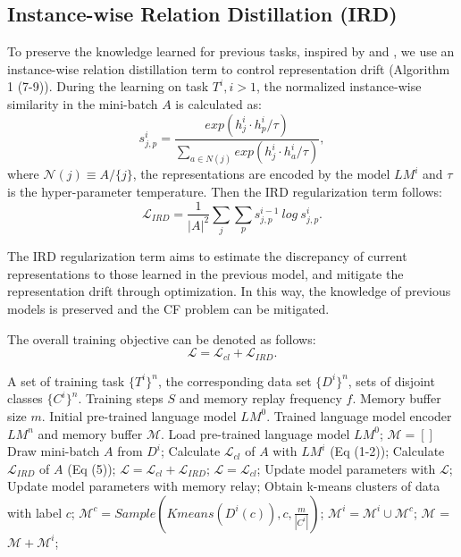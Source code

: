 \subsection{Instance-wise Relation Distillation (IRD)}
To preserve the knowledge learned for previous tasks, inspired by \citet{fang2020seed} and \citet{cha2021co2l}, we use an instance-wise relation distillation term to control representation drift (Algorithm 1 (7-9)). During the learning on task $T^i, i>1$, the normalized instance-wise similarity in the mini-batch $A$ is calculated as:
\begin{equation}
    s_{j,p}^i  =\frac{exp({h}^i_j\cdot{h}^i_p/\tau)}{\sum_{a\in N(j)}exp({h}^i_j\cdot{h}^i_a/\tau)},
\end{equation}
where $\mathcal{N}(j)\equiv A/\{j\}$, the representations are encoded by the model $LM^i$ and $\tau$ is the hyper-parameter temperature. Then the IRD regularization term follows: 
\begin{equation}
    \mathcal{L}_{IRD} = \frac{1}{|A|^2}\sum_j\sum_{p} s_{j,p}^{i-1}\ log \ s_{j,p}^{i}.
\end{equation}

The IRD regularization term aims to  estimate the discrepancy of current representations to those learned in the previous model, and mitigate the representation drift through optimization.  In this way, the knowledge of previous  models is preserved and the CF problem can be mitigated.

The overall training objective can be denoted as follows:
\begin{equation}
    \mathcal{L} = \mathcal{L}_{cl}+\mathcal{L}_{IRD}.
\end{equation}

\begin{algorithm}[t]\small
\caption{SCCL Training}
\label{alg}
\begin{algorithmic}[1]
\REQUIRE
A set of training task $\{T^i\}^n$, the corresponding data set $\{D^i\}^n$,  sets of disjoint classes $\{C^i\}^n$. Training steps $S$ and memory replay frequency $f$. Memory buffer size $m$.  Initial pre-trained language model $LM^0$. 
\ENSURE Trained language model encoder $LM^{n}$ and memory buffer $\mathcal{M}$.
\STATE Load pre-trained language model $LM^0$;
\STATE $\mathcal{M} = []$
\STATE Draw mini-batch $A$ from $D^i$;
\STATE Calculate $\mathcal{L}_{cl}$ of $A$  with $LM^i$ (Eq (1-2));
\STATE Calculate $\mathcal{L}_{IRD}$ of $A$  (Eq (5));
\STATE $\mathcal{L} = \mathcal{L}_{cl}+\mathcal{L}_{IRD}$;
  \ELSE 
    \STATE $\mathcal{L} =\mathcal{L}_{cl}$;
\ENDIF
 \STATE Update model parameters with $\mathcal{L}$;
 \STATE Update model parameters with memory relay;
\ENDIF
 \ENDFOR
{}
\STATE Obtain k-means clusters of data with label $c$;
\STATE $\mathcal{M}^c = Sample(Kmeans(D^i(c)),c,\frac{m}{|C^i|})$;
\STATE $\mathcal{M}^i=\mathcal{M}^i \cup \mathcal{M}^c$;
  \ENDFOR
\STATE $\mathcal{M}$ = $\mathcal{M} +\mathcal{M}^i $;

\ENDFOR

\end{algorithmic}
\end{algorithm}


